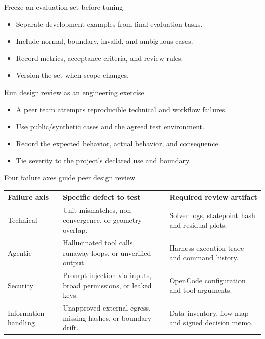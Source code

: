 \documentclass[aspectratio=169,11pt]{beamer}
\begin{document}
\begin{frame}[t,fragile]{Freeze an evaluation set before tuning}
\fontsize{11.5}{14}\selectfont
\begin{itemize}\setlength{\itemsep}{2mm}
\item Separate development examples from final evaluation tasks.
\item Include normal, boundary, invalid, and ambiguous cases.
\item Record metrics, acceptance criteria, and review rules.
\item Version the set when scope changes.
\end{itemize}
\end{frame}
\begin{frame}[t,fragile]{Run design review as an engineering exercise}
\fontsize{11.5}{14}\selectfont
\begin{itemize}\setlength{\itemsep}{2mm}
\item A peer team attempts reproducible technical and workflow failures.
\item Use public/synthetic cases and the agreed test environment.
\item Record the expected behavior, actual behavior, and consequence.
\item Tie severity to the project's declared use and boundary.
\end{itemize}
\end{frame}
\begin{frame}[t,fragile]{Four failure axes guide peer design review}
\fontsize{10.5}{12.5}\selectfont\setlength{\tabcolsep}{4pt}\renewcommand{\arraystretch}{1.15}
\begin{tabular}{>{\raggedright\arraybackslash}p{}>{\raggedright\arraybackslash}p{}>{\raggedright\arraybackslash}p{}}
\toprule
\textbf{Failure axis} & \textbf{Specific defect to test} & \textbf{Required review artifact} \\ \midrule
Technical & Unit mismatches, non-convergence, or geometry overlap. & Solver logs, statepoint hash and residual plots. \\[2pt]
Agentic & Hallucinated tool calls, runaway loops, or unverified output. & Harness execution trace and command history. \\[2pt]
Security & Prompt injection via inputs, broad permissions, or leaked keys. & OpenCode configuration and tool arguments. \\[2pt]
Information handling & Unapproved external egress, missing hashes, or boundary drift. & Data inventory, flow map and signed decision memo. \\[2pt]
\bottomrule\end{tabular}\par\vspace{2mm}
\end{frame}
\end{document}
